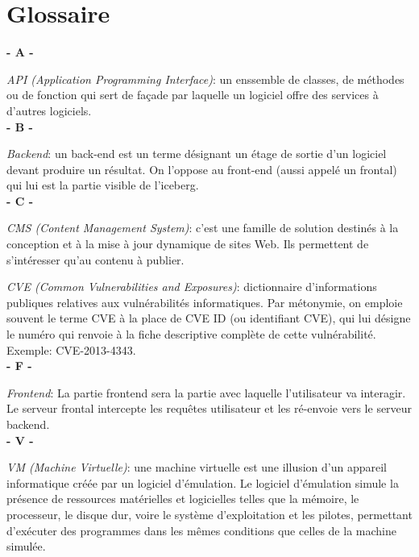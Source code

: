 \section{Glossaire}
\noindent

\vskip 0.1cm
\textbf{- A -}\\
\vskip 0.1cm

\textit{API (Application Programming Interface)}: un enssemble de classes, de méthodes ou de fonction qui sert de façade par laquelle un logiciel offre des services à d'autres logiciels.\\

\vskip 0.1cm
\textbf{- B -}\\
\vskip 0.1cm

\textit{Backend}: un back-end est un terme désignant un étage de sortie d'un logiciel devant produire un résultat. On l'oppose au front-end (aussi appelé un frontal) qui lui est la partie visible de l'iceberg.\\

\vskip 0.1cm
\textbf{- C -}\\
\vskip 0.1cm

\textit{CMS (Content Management System)}: c'est une famille de solution destinés à la conception et à la mise à jour dynamique de sites Web. Ils permettent de s'intéresser qu'au contenu à publier.

\textit{CVE (Common Vulnerabilities and Exposures)}: dictionnaire d'informations publiques relatives aux vulnérabilités informatiques. Par métonymie, on emploie souvent le terme CVE à la place de CVE ID (ou identifiant CVE), qui lui désigne le numéro qui renvoie à la fiche descriptive complète de cette vulnérabilité. Exemple: CVE-2013-4343.\\

\vskip 0.1cm
\textbf{- F -}\\
\vskip 0.1cm

\textit{Frontend}: La partie frontend sera la partie avec laquelle l'utilisateur va interagir. Le serveur frontal intercepte les requêtes utilisateur et les ré-envoie vers le serveur backend. \\

\vskip 0.1cm
\textbf{- V -}\\
\vskip 0.1cm

\textit{VM (Machine Virtuelle)}: une machine virtuelle est une illusion d'un appareil informatique créée par un logiciel d'émulation. Le logiciel d'émulation simule la présence de ressources matérielles et logicielles telles que la mémoire, le processeur, le disque dur, voire le système d'exploitation et les pilotes, permettant d'exécuter des programmes dans les mêmes conditions que celles de la machine simulée.\\

